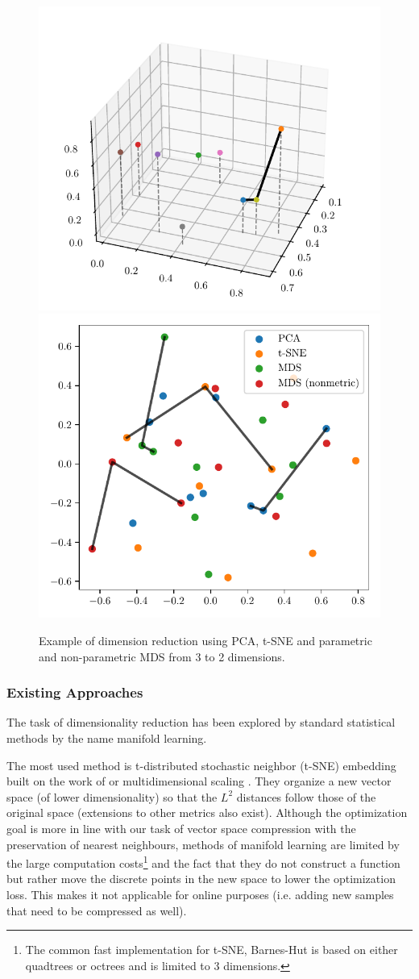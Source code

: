 \begin{figure}[ht]
    \hspace{-0.05\linewidth}
    \includegraphics[width=0.58\linewidth]{img/manifold_examples_3d.pdf}
    \hspace{-0.06\linewidth}
    \includegraphics[width=0.54\linewidth]{img/manifold_examples_2d.pdf}
    \caption{Example of dimension reduction using PCA, t-SNE and parametric and non-parametric MDS from 3 to 2 dimensions.}
    \label{fig:manifold_example}
\end{figure}

\subsubsection{Existing Approaches}

The task of dimensionality reduction has been explored by standard statistical methods by the name manifold learning.

The most used method is t-distributed stochastic neighbor (t-SNE) embedding built on the work of \citet{hinton2002stochastic} or multidimensional scaling \citep{kruskal1964nonmetric,borg2005modern}.
They organize a new vector space (of lower dimensionality) so that the $L^2$ distances follow those of the original space (extensions to other metrics also exist).
Although the optimization goal is more in line with our task of vector space compression with the preservation of nearest neighbours, methods of manifold learning are limited by the large computation costs\footnote{
The common fast implementation for t-SNE, Barnes-Hut \citep{barnes1986hierarchical,van2013barnes} is based on either quadtrees or octrees and is limited to $3$ dimensions.} and the fact that they do not construct a function but rather move the discrete points in the new space to lower the optimization loss.
This makes it not applicable for online purposes (i.e. adding new samples that need to be compressed as well).


